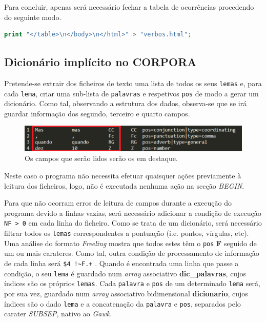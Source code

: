 \documentclass[a4paper]{article}
\begin{document}
\par Para concluir, apenas será necessário fechar a tabela de ocorrências procedendo do seguinte modo.
\begin{lstlisting}[language=Awk, caption=Fecho da tabela que alberga a totalidade da informação.]
    print "</table>\n</body>\n</html>" > "verbos.html";
\end{lstlisting}

\subsection{Dicionário implícito no CORPORA}

\hspace{3mm} Pretende-se extrair dos ficheiros de texto uma lista de todos os seus \texttt{lemas} e, para cada \texttt{lema}, criar uma sub-lista de \texttt{palavras} e respetivos \texttt{pos} de modo a gerar um dicionário. Como tal, observando a estrutura dos dados, observa-se que se irá guardar informação dos segundo, terceiro e quarto campos.

\begin{figure}[!h]
    \centering
    \includegraphics{dic1.png}
    \caption{Os campos que serão lidos serão os em destaque.}
    \label{fig:dic1}
\end{figure}

\par Neste caso o programa não necessita efetuar quaisquer ações previamente à leitura dos ficheiros, logo, não é executada nenhuma ação na secção \textit{BEGIN}.

\par Para que não ocorram erros de leitura de campos durante a execução do programa devido a linhas vazias, será necessário adicionar a condição de execução \texttt{NF > 0} em cada linha do ficheiro. Como se trata de um dicionário, será necessário filtrar todos os \texttt{lemas} correspondentes a pontuação (i.e. pontos, vírgulas, etc). Uma análise do formato \textit{Freeling} mostra que todos estes têm o \texttt{pos} \textbf{F} seguido de um ou mais carateres. \cite{Freeling} Como tal, outra condição de processamento de informação de cada linha será \texttt{\$4 !\~ \/F.+\/} . Quando é encontrada uma linha que passe a condição, o seu \texttt{lema} é guardado num \textit{array} associativo \textbf{dic\_palavras}, cujos índices são os próprios \texttt{lemas}. Cada \texttt{palavra} e \texttt{pos} de um determinado \texttt{lema} será, por sua vez, guardado num \textit{array} associativo bidimensional \textbf{dicionario}, cujos índices são o dado \texttt{lema} e a concatenação da \texttt{palavra} e \texttt{pos}, separados pelo carater \textit{SUBSEP}, nativo ao \textit{Gawk}.
\end{document}

